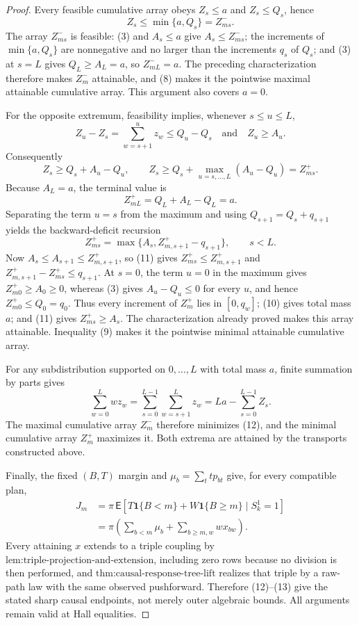 \documentclass{article}
\begin{document}
\begin{proof}
Every feasible cumulative array obeys \(Z_s\le a\) and \(Z_s\le Q_s\), hence
\[
 Z_s\le \min\{a,Q_s\}=Z_{ms}^{-}.                        \tag{8}
\]
The array \(Z_{ms}^{-}\) is feasible: (3) and \(A_s\le a\) give \(A_s\le Z_{ms}^{-}\); the increments of \(\min\{a,Q_s\}\) are nonnegative and no larger than the increments \(q_s\) of \(Q_s\); and (3) at \(s=L\) gives \(Q_L\ge A_L=a\), so \(Z_{mL}^{-}=a\).  The preceding characterization therefore makes \(Z_m^{-}\) attainable, and (8) makes it the pointwise maximal attainable cumulative array.  This argument also covers \(a=0\).

For the opposite extremum, feasibility implies, whenever \(s\le u\le L\),
\[
 Z_u-Z_s=\sum_{w=s+1}^uz_w\le Q_u-Q_s
 \quad\text{and}\quad Z_u\ge A_u.
\]
Consequently
\[
 Z_s\ge Q_s+A_u-Q_u,
 \qquad
 Z_s\ge Q_s+\max_{u=s,\ldots,L}(A_u-Q_u)=Z_{ms}^{+}.       \tag{9}
\]
Because \(A_L=a\), the terminal value is
\[
 Z_{mL}^{+}=Q_L+A_L-Q_L=a.                                \tag{10}
\]
Separating the term \(u=s\) from the maximum and using \(Q_{s+1}=Q_s+q_{s+1}\) yields the backward-deficit recursion
\[
 Z_{ms}^{+}=\max\{A_s,Z_{m,s+1}^{+}-q_{s+1}\},
 \qquad s<L.                                               \tag{11}
\]
Now \(A_s\le A_{s+1}\le Z_{m,s+1}^{+}\), so (11) gives \(Z_{ms}^{+}\le Z_{m,s+1}^{+}\) and \(Z_{m,s+1}^{+}-Z_{ms}^{+}\le q_{s+1}\).  At \(s=0\), the term \(u=0\) in the maximum gives \(Z_{m0}^{+}\ge A_0\ge0\), whereas (3) gives \(A_u-Q_u\le0\) for every \(u\), and hence \(Z_{m0}^{+}\le Q_0=q_0\).  Thus every increment of \(Z_m^{+}\) lies in \([0,q_w]\); (10) gives total mass \(a\); and (11) gives \(Z_{ms}^{+}\ge A_s\).  The characterization already proved makes this array attainable.  Inequality (9) makes it the pointwise minimal attainable cumulative array.

For any subdistribution supported on \(0,\ldots,L\) with total mass \(a\), finite summation by parts gives
\[
 \sum_{w=0}^{L}wz_w
 =\sum_{s=0}^{L-1}\sum_{w=s+1}^{L}z_w
 =La-\sum_{s=0}^{L-1}Z_s.                                 \tag{12}
\]
The maximal cumulative array \(Z_m^{-}\) therefore minimizes (12), and the minimal cumulative array \(Z_m^{+}\) maximizes it.  Both extrema are attained by the transports constructed above.

Finally, the fixed \((B,T)\) margin and \(\mu_b=\sum_ttp_{bt}\) give, for every compatible plan,
\[
 \begin{aligned}
 J_m
 &=\pi\,\mathsf E[T\mathbf 1\{B<m\}+W\mathbf 1\{B\ge m\}\mid S_k^1=1]\\
 &=\pi\left(\sum_{b<m}\mu_b+\sum_{b\ge m,w}wx_{bw}\right).               \tag{13}
 \end{aligned}
\]
Every attaining \(x\) extends to a triple coupling by \(\text{lem:triple-projection-and-extension}\), including zero rows because no division is then performed, and \(\text{thm:causal-response-tree-lift}\) realizes that triple by a raw-path law with the same observed pushforward.  Therefore (12)--(13) give the stated sharp causal endpoints, not merely outer algebraic bounds.  All arguments remain valid at Hall equalities.
\end{proof}
\end{document}
